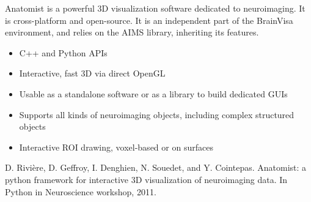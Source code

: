 \documentclass[letterpaper,landscape,english,9pt]{report}
\begin{document}
\begin{multicols}{3}
Anatomist is a powerful 3D visualization software dedicated to
neuroimaging.  It is cross-platform and open-source. It is an
independent part of the BrainVisa environment, and relies on the AIMS
library, inheriting its features.
\begin{itemize}[nolistsep,topsep=0em,leftmargin=1pc]
\item C++ and Python APIs
\item Interactive, fast 3D via direct OpenGL
\item Usable as a standalone software or as a library to build dedicated GUIs
\item Supports all kinds of neuroimaging objects, including complex structured
objects
\item Interactive ROI drawing, voxel-based or on surfaces
\end{itemize}
D. Rivière, D. Geffroy, I. Denghien, N. Souedet, and Y. Cointepas.
Anatomist: a python framework for interactive 3D visualization of neuroimaging
data. In Python in Neuroscience workshop, 2011.

\end{multicols}
\end{document}
